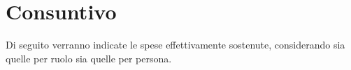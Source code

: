 \section{Consuntivo}
Di seguito verranno indicate le spese effettivamente sostenute, considerando sia quelle per ruolo sia quelle per persona.